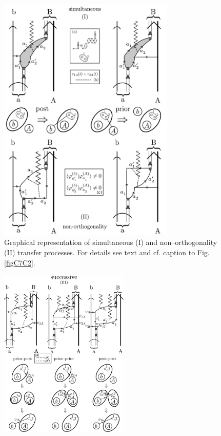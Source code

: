 \begin{subappendices}
 \begin{figure}[h!]
 	\begin{center}
\includegraphics*[width=0.75\textwidth]{C7/figs_C7/Reaction1}
\end{center}
\caption{Graphical representation of simultaneous (I) and non--orthogonality (II) transfer processes. For details see text and cf. caption to Fig. \ref{figC7C2}.}\label{figC7C1}
\end{figure}
 \begin{figure}[h!]
 	\begin{center}
\includegraphics*[width=0.55\textwidth]{C7/figs_C7/Reaction2}

\end{center}
\end{figure}
\end{subappendices}
